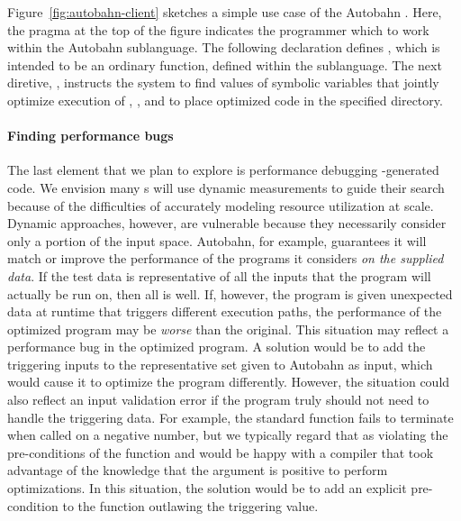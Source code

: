 Figure~\ref{fig:autobahn-client} sketches a simple use case of the Autobahn \rasp.
Here, the pragma at the top of the figure indicates the programmer which to work
within the Autobahn sublanguage.  The following declaration defines ,
which is intended to be an ordinary function, defined within the \rasp{} sublanguage.
The next diretive, , instructs the system to find values of symbolic
variables that jointly optimize execution of , , \etc{}
and to place optimized code in the specified directory.

\paragraph*{Finding performance bugs}
The last element that we plan to explore is performance debugging
\rasp{}-generated code.
We envision many \rasp{}s will use dynamic measurements to guide their search
because of the difficulties of accurately modeling resource utilization
at scale.
Dynamic approaches, however, are vulnerable because they necessarily
consider only a portion of the input space.
Autobahn, for example, guarantees it will match or improve the
performance of the programs it considers
\textit{on the supplied data}.  If the test data is representative of
all the inputs that the program will actually be run on, then all is
well. If, however, the program is given unexpected data at runtime
that triggers different execution paths, the performance of the
optimized program may be \textit{worse} than the original.
This situation may reflect a performance bug in the optimized
program.  A solution would be to add the triggering inputs to the
representative set given to Autobahn as input, which would cause it to
optimize the program differently.  However, the situation could also
reflect an input validation error if the program truly should not need
to handle the triggering data.  For example, the standard 
function fails to terminate when called on a negative number, but we
typically regard that as violating the pre-conditions of the function
and would be happy with a compiler that took advantage of the
knowledge that the argument is positive to perform optimizations.  In
this situation, the solution would be to add an explicit pre-condition
to the function outlawing the triggering value.


